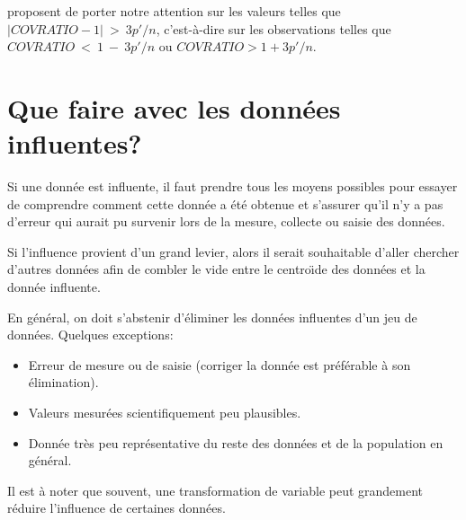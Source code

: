 \citet{Bel_Kuh_Wel:80} proposent de porter notre attention sur les valeurs telles que
$|COVRATIO-1|~>~3p'/n$, c'est-à-dire sur les observations telles que\\ $COVRATIO~<~1~-~3p'/n$ ou $COVRATIO>1+3p'/n$.



\section{Que faire avec les données influentes?}
Si une donnée est influente, il faut prendre tous les moyens
possibles pour essayer de comprendre comment cette donnée a été
obtenue et s'assurer qu'il n'y a pas d'erreur qui aurait pu
survenir lors de la mesure, collecte ou saisie des données.

Si l'influence provient d'un grand
levier, alors il serait souhaitable d'aller chercher d'autres
données afin de combler le vide entre le centro\"{\i}de des
données et la donnée influente.

En général, on doit s'abstenir d'éliminer les données
influentes d'un jeu de données. Quelques exceptions:
\begin{itemize}
\item Erreur de mesure ou  de  saisie (corriger la donnée
est préférable \`a son élimination). \item Valeurs
mesurées scientifiquement peu plausibles. \item Donnée très
peu représentative du reste des données et de la population en
général. \end{itemize}

Il est \`a noter que souvent, une transformation de variable peut
grandement réduire l'influence de certaines données. 